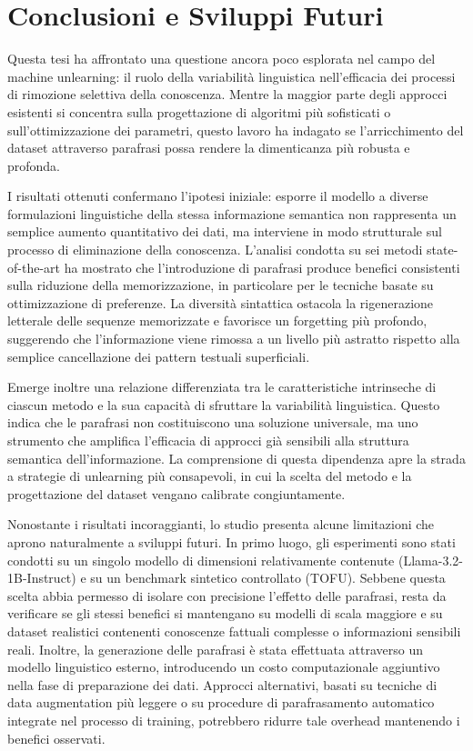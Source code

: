 \chapter{Conclusioni e Sviluppi Futuri}

Questa tesi ha affrontato una questione ancora poco esplorata nel campo del machine unlearning: il ruolo della variabilità linguistica nell'efficacia dei processi di rimozione selettiva della conoscenza. Mentre la maggior parte degli approcci esistenti si concentra sulla progettazione di algoritmi più sofisticati o sull'ottimizzazione dei parametri, questo lavoro ha indagato se l'arricchimento del dataset attraverso parafrasi possa rendere la dimenticanza più robusta e profonda.

I risultati ottenuti confermano l'ipotesi iniziale: esporre il modello a diverse formulazioni linguistiche della stessa informazione semantica non rappresenta un semplice aumento quantitativo dei dati, ma interviene in modo strutturale sul processo di eliminazione della conoscenza. L'analisi condotta su sei metodi state-of-the-art ha mostrato che l'introduzione di parafrasi produce benefici consistenti sulla riduzione della memorizzazione, in particolare per le tecniche basate su ottimizzazione di preferenze. La diversità sintattica ostacola la rigenerazione letterale delle sequenze memorizzate e favorisce un forgetting più profondo, suggerendo che l'informazione viene rimossa a un livello più astratto rispetto alla semplice cancellazione dei pattern testuali superficiali.

Emerge inoltre una relazione differenziata tra le caratteristiche intrinseche di ciascun metodo e la sua capacità di sfruttare la variabilità linguistica. Questo indica che le parafrasi non costituiscono una soluzione universale, ma uno strumento che amplifica l'efficacia di approcci già sensibili alla struttura semantica dell'informazione. La comprensione di questa dipendenza apre la strada a strategie di unlearning più consapevoli, in cui la scelta del metodo e la progettazione del dataset vengano calibrate congiuntamente.

Nonostante i risultati incoraggianti, lo studio presenta alcune limitazioni che aprono naturalmente a sviluppi futuri. In primo luogo, gli esperimenti sono stati condotti su un singolo modello di dimensioni relativamente contenute (Llama-3.2-1B-Instruct) e su un benchmark sintetico controllato (TOFU). Sebbene questa scelta abbia permesso di isolare con precisione l'effetto delle parafrasi, resta da verificare se gli stessi benefici si mantengano su modelli di scala maggiore e su dataset realistici contenenti conoscenze fattuali complesse o informazioni sensibili reali. Inoltre, la generazione delle parafrasi è stata effettuata attraverso un modello linguistico esterno, introducendo un costo computazionale aggiuntivo nella fase di preparazione dei dati. Approcci alternativi, basati su tecniche di data augmentation più leggere o su procedure di parafrasamento automatico integrate nel processo di training, potrebbero ridurre tale overhead mantenendo i benefici osservati.

